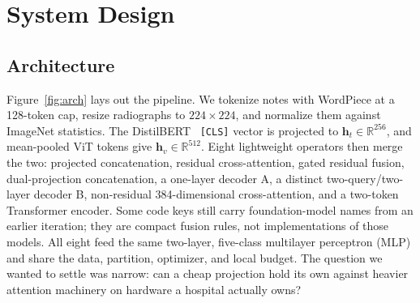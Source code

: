 \documentclass[letterpaper, conference]{IEEEtran}
\begin{document}
\section{System Design}

\subsection{Architecture}

Figure~\ref{fig:arch} lays out the pipeline. We tokenize notes with WordPiece at
a 128-token cap, resize radiographs to $224{\times}224$, and normalize them
against ImageNet statistics. The DistilBERT~\cite{Sanh2019} \texttt{[CLS]} vector
is projected to $\mathbf{h}_t\!\in\!\mathbb{R}^{256}$, and mean-pooled ViT tokens
give $\mathbf{h}_v\!\in\!\mathbb{R}^{512}$. Eight lightweight operators then
merge the two: projected concatenation, residual cross-attention, gated residual
fusion, dual-projection concatenation, a one-layer decoder A, a distinct
two-query/two-layer decoder B, non-residual 384-dimensional cross-attention, and
a two-token Transformer encoder. Some code keys still carry foundation-model names
from an earlier iteration; they are compact fusion rules, not implementations of
those models. All eight feed the same two-layer, five-class multilayer perceptron
(MLP) and share the data, partition, optimizer, and local budget. The question we
wanted to settle was narrow: can a cheap projection hold its own against heavier
attention machinery on hardware a hospital actually owns?
\end{document}
